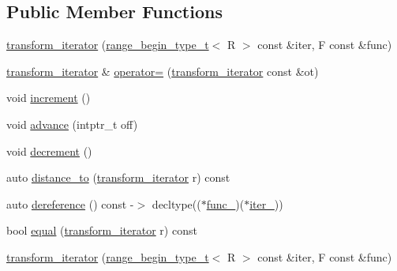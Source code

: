 \subsection*{Public Member Functions}
\begin{DoxyCompactItemize}
\item 
\mbox{\hyperlink{structrah_1_1view_1_1transform__iterator_ae8f127be961b14896c87d94e710a9a1a}{transform\+\_\+iterator}} (\mbox{\hyperlink{namespacerah_a28aff4eeddcece6be65ff0b956d32d4a}{range\+\_\+begin\+\_\+type\+\_\+t}}$<$ R $>$ const \&iter, F const \&func)
\item 
\mbox{\hyperlink{structrah_1_1view_1_1transform__iterator}{transform\+\_\+iterator}} \& \mbox{\hyperlink{structrah_1_1view_1_1transform__iterator_a4589b5fff7d8505b8a569c9d1f863929}{operator=}} (\mbox{\hyperlink{structrah_1_1view_1_1transform__iterator}{transform\+\_\+iterator}} const \&ot)
\item 
void \mbox{\hyperlink{structrah_1_1view_1_1transform__iterator_a1ee5c30f733b63b1cd26baa121389dd1}{increment}} ()
\item 
void \mbox{\hyperlink{structrah_1_1view_1_1transform__iterator_a56c602664659b11bfca3da418c6977be}{advance}} (intptr\+\_\+t off)
\item 
void \mbox{\hyperlink{structrah_1_1view_1_1transform__iterator_a05c99213d071102e793d57b967f7880d}{decrement}} ()
\item 
auto \mbox{\hyperlink{structrah_1_1view_1_1transform__iterator_ae0919c95985ebca42017346da790c981}{distance\+\_\+to}} (\mbox{\hyperlink{structrah_1_1view_1_1transform__iterator}{transform\+\_\+iterator}} r) const
\item 
auto \mbox{\hyperlink{structrah_1_1view_1_1transform__iterator_a8059ce2756def1dcd7c91d5349d2661a}{dereference}} () const -\/$>$ decltype(($\ast$\mbox{\hyperlink{structrah_1_1view_1_1transform__iterator_aaac20c3aa93a6ac347e8c26d8c892ea9}{func\+\_\+}})($\ast$\mbox{\hyperlink{structrah_1_1view_1_1transform__iterator_a349798fe3a741068fd28e50387f39e80}{iter\+\_\+}}))
\item 
bool \mbox{\hyperlink{structrah_1_1view_1_1transform__iterator_a68105373ae5ce99863589e17605f3833}{equal}} (\mbox{\hyperlink{structrah_1_1view_1_1transform__iterator}{transform\+\_\+iterator}} r) const
\item 
\mbox{\hyperlink{structrah_1_1view_1_1transform__iterator_ae8f127be961b14896c87d94e710a9a1a}{transform\+\_\+iterator}} (\mbox{\hyperlink{namespacerah_a28aff4eeddcece6be65ff0b956d32d4a}{range\+\_\+begin\+\_\+type\+\_\+t}}$<$ R $>$ const \&iter, F const \&func)

\end{DoxyCompactItemize}
